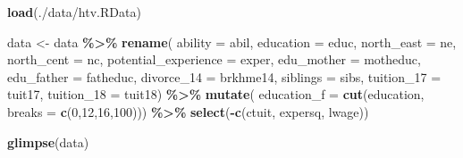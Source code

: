 \documentclass[
]{book}
\newenvironment{Shaded}{\begin{snugshade}}{\end{snugshade}}
\newcommand{\AttributeTok}[1]{\textcolor[rgb]{0.13,0.29,0.53}{#1}}
\newcommand{\DecValTok}[1]{\textcolor[rgb]{0.00,0.00,0.81}{#1}}
\newcommand{\FunctionTok}[1]{\textcolor[rgb]{0.13,0.29,0.53}{\textbf{#1}}}
\newcommand{\NormalTok}[1]{#1}
\newcommand{\OtherTok}[1]{\textcolor[rgb]{0.56,0.35,0.01}{#1}}
\newcommand{\SpecialCharTok}[1]{\textcolor[rgb]{0.81,0.36,0.00}{\textbf{#1}}}
\newcommand{\StringTok}[1]{\textcolor[rgb]{0.31,0.60,0.02}{#1}}
\theoremstyle{definition}
\theoremstyle{definition}
\theoremstyle{definition}
\theoremstyle{definition}
\theoremstyle{remark}
\begin{document}
\begin{Shaded}
\begin{Highlighting}[]
\FunctionTok{load}\NormalTok{(}\StringTok{\textquotesingle{}./data/htv.RData\textquotesingle{}}\NormalTok{)}

\NormalTok{data }\OtherTok{\textless{}{-}}\NormalTok{ data }\SpecialCharTok{\%\textgreater{}\%} 
  \FunctionTok{rename}\NormalTok{(}
    \AttributeTok{ability    =}\NormalTok{ abil, }
    \AttributeTok{education  =}\NormalTok{ educ, }
    \AttributeTok{north\_east =}\NormalTok{ ne, }
    \AttributeTok{north\_cent =}\NormalTok{ nc, }
    \AttributeTok{potential\_experience =}\NormalTok{ exper, }
    \AttributeTok{edu\_mother =}\NormalTok{ motheduc, }
    \AttributeTok{edu\_father =}\NormalTok{ fatheduc, }
    \AttributeTok{divorce\_14 =}\NormalTok{ brkhme14, }
    \AttributeTok{siblings   =}\NormalTok{ sibs, }
    \AttributeTok{tuition\_17 =}\NormalTok{ tuit17, }
    \AttributeTok{tuition\_18 =}\NormalTok{ tuit18) }\SpecialCharTok{\%\textgreater{}\%} 
  \FunctionTok{mutate}\NormalTok{(}
    \AttributeTok{education\_f =} \FunctionTok{cut}\NormalTok{(education, }\AttributeTok{breaks =} \FunctionTok{c}\NormalTok{(}\DecValTok{0}\NormalTok{,}\DecValTok{12}\NormalTok{,}\DecValTok{16}\NormalTok{,}\DecValTok{100}\NormalTok{))) }\SpecialCharTok{\%\textgreater{}\%}
  \FunctionTok{select}\NormalTok{(}\SpecialCharTok{{-}}\FunctionTok{c}\NormalTok{(ctuit, expersq, lwage))}
  
\FunctionTok{glimpse}\NormalTok{(data)}
\end{Highlighting}
\end{Shaded}
\end{document}
